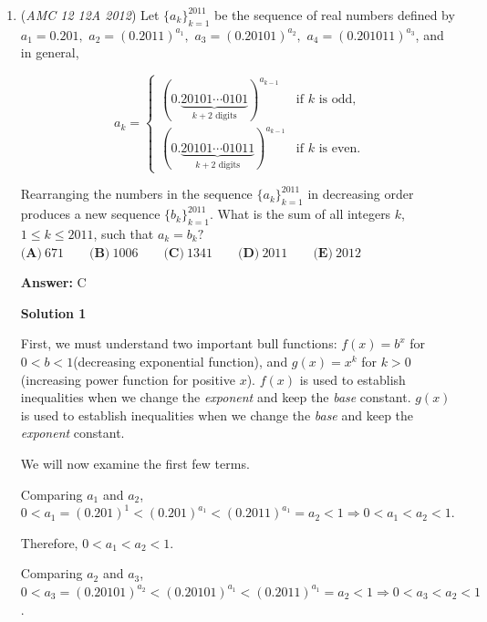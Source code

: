 \begin{enumerate}
 By periodicity, this probability is the same for all $0 \le x \le 2012$ and $0 \le y \le 2012$. Therefore, the answer is $0.16 = \boxed{\frac{4}{25} \textbf{(C)} }$

 \href{https://artofproblemsolving.com/videos/amc/2012amc12a/254}{https://artofproblemsolving.com/videos/amc/2012amc12a/254}

 


	\item (\textit{AMC 12 12A 2012}) Let $\{a_k\}_{k=1}^{2011}$ be the sequence of real numbers defined by $a_1=0.201,$ $a_2=(0.2011)^{a_1},$ $a_3=(0.20101)^{a_2},$ $a_4=(0.201011)^{a_3}$, and in general, 


 
 \[a_k=\begin{cases} (0.\underbrace{20101\cdots 0101}_{k+2\text{ digits}})^{a_{k-1}} & \text{if }k\text{ is odd,}\\ (0.\underbrace{20101\cdots 01011}_{k+2\text{ digits}})^{a_{k-1}}& \text{if }k\text{ is even.} \end{cases}\]


 Rearranging the numbers in the sequence  $\{a_k\}_{k=1}^{2011}$ in decreasing order produces a new sequence  $\{b_k\}_{k=1}^{2011}$.  What is the sum of all integers $k$, $1\le k \le 2011$, such that $a_k=b_k?$
$\textbf{(A)}\ 671\qquad\textbf{(B)}\ 1006\qquad\textbf{(C)}\ 1341\qquad\textbf{(D)}\ 2011\qquad\textbf{(E)}\ 2012$

 \textbf{Answer: }C



\textbf{Solution 1}

First, we must understand two important bull functions: $f(x) = b^x$ for $0 < b < 1$(decreasing exponential function), and $g(x) = x^k$ for $k > 0$(increasing power function for positive $x$). $f(x)$ is used to establish inequalities when we change the \textit{exponent} and keep the \textit{base} constant. $g(x)$ is used to establish inequalities when we change the \textit{base} and keep the \textit{exponent} constant.

 We will now examine the first few terms.

 Comparing $a_1$ and $a_2$, $0 < a_1 = (0.201)^1 < (0.201)^{a_1} < (0.2011)^{a_1} = a_2 < 1 \Rightarrow 0 < a_1 < a_2 < 1$.

 Therefore, $0 < a_1 < a_2 < 1$.

 Comparing $a_2$ and $a_3$, $0 < a_3 = (0.20101)^{a_2} < (0.20101)^{a_1} < (0.2011)^{a_1} = a_2 < 1 \Rightarrow 0 < a_3 < a_2 < 1$.


\end{enumerate}
